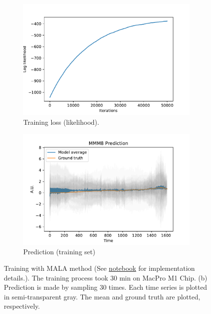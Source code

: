 \documentclass{article}
\begin{document}
\begin{figure}[h]
    \centering
    \begin{subfigure}[b]{0.5\textwidth}
        \centering
        \includegraphics[width=\textwidth]{../img/training_MALA_50000-iter.pdf}
        \caption{Training loss (likelihood).}
        \label{fig:training-log}
    \end{subfigure}%
    \begin{subfigure}[b]{0.5\textwidth}
        \centering
        \includegraphics[width=\textwidth]{../img/prediction_MALA_50000-iter.pdf}
        \caption{Prediction (training set)}
        \label{fig:pred-sub}
    \end{subfigure}
    \caption{Training with MALA method (See \href{https://github.com/stevengogogo/ECEN649_FinalProject/blob/main/script/EXP_fit_time_window.ipynb}{notebook} for implementation details.). The training process took $30$ min on MacPro M1 Chip. (b) Prediction is made by sampling $30$ times. Each time series is plotted in semi-transparent gray. The mean and ground truth are plotted, respectively.}
    \label{fig:pred}
\end{figure}



\end{document}
